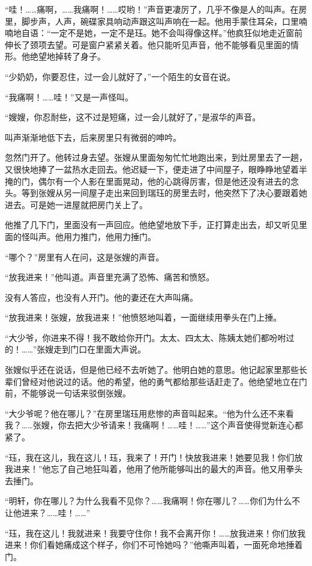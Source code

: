\par “哇！……痛啊，……我痛啊！……哎哟！”声音更凄厉了，几乎不像是人的叫声。在房里，脚步声，人声，碗碟家具响动声跟这叫声响在一起。他用手蒙住耳朵，口里喃喃地自语：“一定不是她，一定不是珏。她不会叫得像这样。”他疯狂似地走近窗前伸长了颈项去望。可是窗户紧紧关着。他只能听见声音，他不能够看见里面的情形。他绝望地掉转了身子。
\par “少奶奶，你要忍住，过一会儿就好了，”一个陌生的女音在说。
\par “我痛啊！……哇！”又是一声怪叫。
\par “嫂嫂，你忍耐些，这不过是短痛，过一会儿就好了，”是淑华的声音。
\par 叫声渐渐地低下去，后来房里只有微弱的呻吟。
\par 忽然门开了。他转过身去望。张嫂从里面匆匆忙忙地跑出来，到灶房里去了一趟，又很快地捧了一盆热水走回去。他迟疑一下，便走进了中间屋子，眼睁睁地望着半掩的门，偶尔有一个人影在里面晃动，他的心跳得厉害，但是他还没有进去的念头。等到张嫂从另一间屋子走出来回到瑞珏的房里去时，他突然下了决心要跟着她进去。可是她一进屋就把房门关上了。
\par 他推了几下门，里面没有一声回应。他绝望地放下手，正打算走出去，却又听见里面的怪叫声。他用力推门，他用力捶门。
\par “哪个？”房里有人在问，这是张嫂的声音。
\par “放我进来！”他叫道。声音里充满了恐怖、痛苦和愤怒。
\par 没有人答应，也没有人开门。他的妻还在大声叫痛。
\par “放我进来！张嫂，放我进来！”他愤怒地叫着，一面继续用拳头在门上捶。
\par “大少爷，你进来不得！我不敢给你开门。太太、四太太、陈姨太她们都吩咐过的！……”张嫂走到门口在里面大声说。
\par 张嫂似乎还在说话，但是他已经不去听她了。他明白她的意思。他记起家里那些长辈们曾经对他说过的话。他的希望，他的勇气都给那些话赶走了。他绝望地立在门前，不能够说一句话来驳倒张嫂。
\par “大少爷呢？他在哪儿？”在房里瑞珏用悲惨的声音叫起来。“他为什么还不来看我？……张嫂，你去把大少爷请来！我痛啊！……哇！……”这个声音使得觉新连心都紧了。
\par “珏，我在这儿，我在这儿！珏，我来了！开门！快放我进来！她要见我！你们放我进来！”他忘了自己地狂叫着，他用了他所能够叫出的最大的声音。他又用拳头去捶门。
\par “明轩，你在哪儿？为什么我看不见你？……我痛啊！你在哪儿？……你们为什么不让他进来？……哇！……”
\par “珏，我在这儿！我就进来！我要守住你！我不会离开你！……放我进来！你们放我进来！你们看她痛成这个样子，你们不可怜她吗？”他嘶声叫着，一面死命地捶着门。
